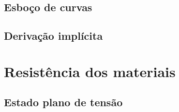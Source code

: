 \documentclass[12pt, a4paper]{article}
\begin{document}
		\subsection{Esboço de curvas}
		
		
		\subsection{Derivação implícita}
		
		
		
	\section{Resistência dos materiais}
		\subsection{Estado plano de tensão}
		
		
\end{document}
